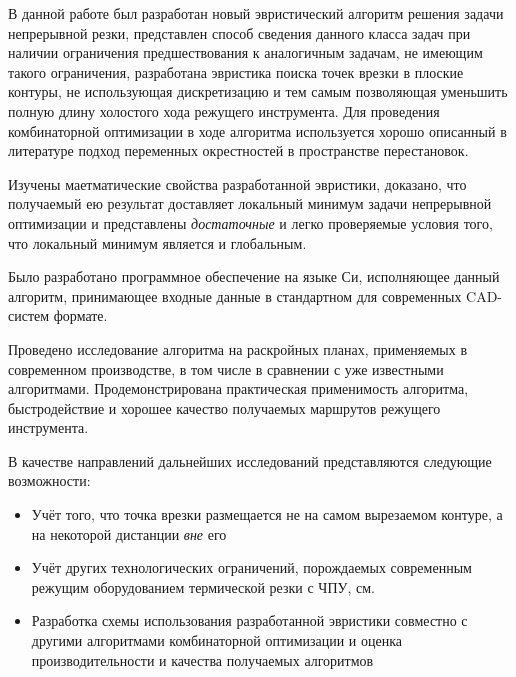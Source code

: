 \documentclass[14pt]{extarticle}
\theoremstyle{plain}%
\theoremstyle{remark}
\begin{document}
В данной работе был разработан
новый эвристический алгоритм решения
задачи непрерывной резки,
представлен способ
сведения данного класса задач
при наличии ограничения предшествования
к аналогичным задачам,
не имеющим такого ограничения,
разработана эвристика
поиска точек врезки в плоские контуры,
не использующая дискретизацию
и тем самым позволяющая уменьшить
полную длину холостого хода
режущего инструмента.
Для проведения комбинаторной оптимизации
в ходе алгоритма используется
хорошо описанный в литературе
подход переменных окрестностей
в пространстве перестановок.

Изучены маетматические свойства разработанной эвристики,
доказано,
что получаемый ею результат
доставляет локальный минимум
задачи непрерывной оптимизации
и представлены
\textit{достаточные}
и легко проверяемые
условия того,
что локальный минимум
является и глобальным.

Было разработано программное обеспечение на языке Си,
исполняющее данный алгоритм,
принимающее входные данные в стандартном
для современных CAD-систем формате.

Проведено исследование алгоритма
на раскройных планах,
применяемых в современном производстве,
в том числе в сравнении с уже
известными алгоритмами.
Продемонстрирована практическая применимость алгоритма,
быстродействие и хорошее качество
получаемых маршрутов режущего инструмента.

В качестве направлений дальнейших исследований
представляются следующие возможности:

\begin{itemize}
  \item
  Учёт того,
  что точка врезки размещается не на самом
  вырезаемом контуре,
  а на некоторой дистанции
  \textit{вне} его
  \item
  Учёт других технологических ограничений,
  порождаемых современным режущим оборудованием
  термической резки с ЧПУ,
  см. \cite{Sozopol}
  \item
  Разработка схемы использования разработанной эвристики
  совместно с другими алгоритмами комбинаторной оптимизации
  и оценка производительности и качества получаемых
  алгоритмов
\end{itemize}

\printbibliography[heading=bibintoc]
\nocite{*}
\end{document}
